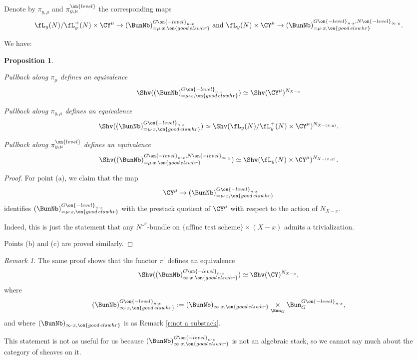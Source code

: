 \documentclass[9pt]{amsart}
\newtheorem{prop}[subsubsection]{Proposition}
\theoremstyle{definition}
\theoremstyle{remark}
\newtheorem{rem}[subsubsection]{Remark}
\numberwithin{equation}{section}
\begin{document}
Denote by $\pi_{y,\mu}$ and $\pi_{y,\mu}^{\on{level}}$ the corresponding maps
$$\fL_y(N)/\fL^+_y(N)\times \CY^\mu \to
(\BunNb)^{G\on{-level}_{n\cdot x}}_{=\mu\cdot x,\on{good\,elswhr}} \text{ and }
\fL_y(N) \times \CY^\mu \to (\BunNb)^{G\on{-level}_{n\cdot x},N\on{-level}_{\infty\cdot y}}_{=\mu\cdot x,\on{good\,elswhr}}.$$

\medskip

We have:

\begin{prop} \label{p:out} \hfill

\smallskip

 Pullback along $\pi_\mu$ defines an equivalence 
$$\Shv((\BunNb)^{G\on{-level}_{n\cdot x}}_{=\mu\cdot x,\on{good\,elswhr}}) \simeq \Shv(\CY^\mu)^{N_{X-x}}$$


\smallskip

Pullback along $\pi_{y,\mu}$ defines an equivalence
$$\Shv((\BunNb)^{G\on{-level}_{n\cdot x}}_{=\mu\cdot x,\on{good\,elswhr}}) \simeq \Shv(\fL_y(N)/\fL^+_y(N)\times \CY^\mu)^{N_{X-(x,y)}}.$$

\smallskip

Pullback along $\pi_{y,\mu}^{\on{level}}$ defines an equivalence
$$\Shv((\BunNb)^{G\on{-level}_{n\cdot x},N\on{-level}_{\infty\cdot y}}_{=\mu\cdot x,\on{good\,elswhr}})\simeq 
\Shv(\fL_y(N) \times \CY^\mu)^{N_{X-(x,y)}}.$$
\end{prop}

\begin{proof}

For point (a), we claim that the map
$$\CY^\mu \to (\BunNb)^{G\on{-level}_{n\cdot x}}_{=\mu\cdot x,\on{good\,elswhr}}$$
identifies $(\BunNb)^{G\on{-level}_{n\cdot x}}_{=\mu\cdot x,\on{good\,elswhr}}$ with the prestack quotient of 
$\CY^\mu$ with respect to the action of $N_{X-x}$.

\medskip

Indeed, this is just the statement that
any $N^{\omega^\rho}$-bundle on $\{\text{affine test scheme}\}\times (X-x)$ admits a trivialization.

\medskip

Points (b) and (c) are proved similarly. 

\end{proof}

\begin{rem}
The same proof shows that the functor $\pi^!$ defines an equivalence
$$\Shv((\BunNb)^{G\on{-level}_{n\cdot x}}_{\infty\cdot x,\on{good\,elswhr}}) \simeq \Shv(\CY)^{N_{X-x}},$$
where 
$$(\BunNb)^{G\on{-level}_{n\cdot x}}_{\infty\cdot x,\on{good\,elswhr}}:=
(\BunNb)_{\infty\cdot x,\on{good\,elswhr}}\underset{\Bun_G}\times \Bun_G^{G\on{-level}_{n\cdot x}},$$
and where $(\BunNb)_{\infty\cdot x,\on{good\,elswhr}}$ is as Remark \ref{r:not a substack}. 

\medskip

This statement is not as useful for us because $(\BunNb)^{G\on{-level}_{n\cdot x}}_{\infty\cdot x,\on{good\,elswhr}}$
is not an algebraic stack, so we cannot say much about the category of sheaves on it. 

\end{rem}
\end{document}
